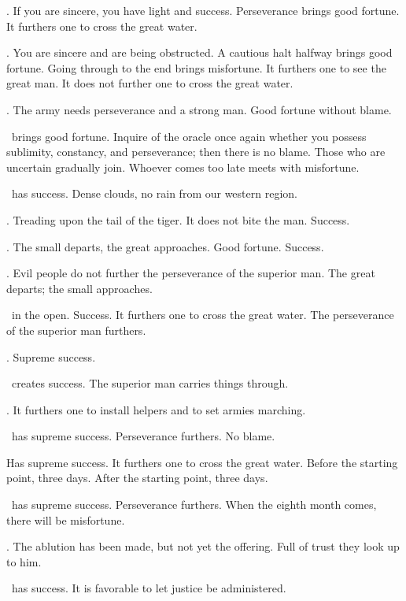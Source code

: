 {\nameit. If you are sincere,
 you have light and success.
 Perseverance brings good fortune.
 It furthers one to cross the great water.}

{\nameit. You are sincere
 and are being obstructed.
 A cautious halt halfway brings good fortune.
 Going through to the end brings misfortune.
 It furthers one to see the great man.
 It does not further one to cross the great water.}

{\nameit. The army needs perseverance
 and a strong man.
 Good fortune without blame.}

{\nameit\ brings good fortune.
 Inquire of the oracle once again
 whether you possess sublimity, constancy, and perseverance;
 then there is no blame.
 Those who are uncertain gradually join.
 Whoever comes too late
 meets with misfortune.}

{\nameit\ has success.
 Dense clouds, no rain from our western region.}

{\nameit. Treading upon the tail of the tiger.
 It does not bite the man. Success.}

{\nameit. The small departs,
 the great approaches.
 Good fortune. Success.}

{\nameit. Evil people do not further
 the perseverance of the superior man.
 The great departs; the small approaches.}

{\nameit\ in the open.
 Success.
 It furthers one to cross the great water.
 The perseverance of the superior man furthers.}

{\nameit.
 Supreme success.}

{\nameit\ creates success.
 The superior man carries things through.}

{\nameit. It furthers one to install helpers
 and to set armies marching.}

{\nameit\ has supreme success.
 Perseverance furthers. No blame.}

{\nameit
 Has supreme success.
 It furthers one to cross the great water.
 Before the starting point, three days.
 After the starting point, three days.}

{\nameit\ has supreme success.
 Perseverance furthers.
 When the eighth month comes,
 there will be misfortune.}

{\nameit. The ablution has been made,
 but not yet the offering.
 Full of trust they look up to him.}

{\nameit\ has success.
 It is favorable to let justice be administered.}

